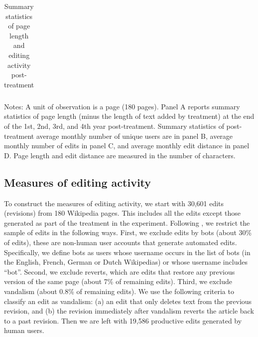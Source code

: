 \documentclass[12pt]{article}
\begin{document}
\begin{table}[ht!]
\renewcommand{\tabcolsep}{10pt}
\begin{center}
\caption{Summary statistics of page length and editing activity post-treatment}
\label{T:SummaryStatistics}
\begin{tabular}{ l cccc cccc }
\hline

\hline
\end{tabular}
\end{center}
\footnotesize{
Notes: A unit of observation is a page (180 pages).
Panel A reports summary statistics of page length (minus the length of text added by treatment) at the end of the 1st, 2nd, 3rd, and 4th year post-treatment. Summary statistics of post-treatment average monthly number of unique users are in panel B, average monthly number of edits in panel C, and average monthly edit distance in panel D. Page length and edit distance are measured in the number of characters. 
}
\end{table}


\subsection{Measures of editing activity}

To construct the measures of editing activity, we start with 30,601 edits (revisions) from 180 Wikipedia pages. This includes all the edits except those generated as part of the treatment in the experiment. Following \cite{aaltonen-seiler-2016}, we restrict the sample of edits in the following ways. First, we exclude edits by bots (about 30\% of edits), these are non-human user accounts that generate automated edits. Specifically, we define bots as users whose username occurs in the list of bots (in the English, French, German or Dutch Wikipedias) or whose username includes ``bot''. Second, we exclude reverts, which are edits that restore any previous version of the same page (about 7\% of remaining edits). Third, we exclude vandalism (about 0.8\% of remaining edits). We use the following criteria to classify an edit as vandalism: (a) an edit that only deletes text from the previous revision, and (b) the revision immediately after vandalism reverts the article back to a past revision. Then we are left with 19,586 productive edits generated by human users.
\end{document}
